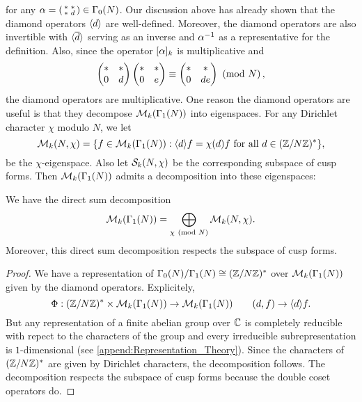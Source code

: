       for any $\alpha = \begin{psmallmatrix} \ast & \ast \\ \ast & d \end{psmallmatrix} \in \Gamma_{0}(N)$. Our discussion above has already shown that the diamond operators $\langle d\rangle$ are well-defined. Moreover, the diamond operators are also invertible with $\langle\overline{d}\rangle$ serving as an inverse and $\alpha^{-1}$ as a representative for the definition. Also, since the operator $[\alpha]_{k}$ is multiplicative and
      \[
        \begin{pmatrix} \ast & \ast \\ 0 & d \end{pmatrix}\begin{pmatrix} \ast & \ast \\ 0 & e \end{pmatrix} \equiv \begin{pmatrix} \ast & \ast \\ 0 & de \end{pmatrix} \ \left(\text{mod }N\right),
      \]
      the diamond operators are multiplicative. One reason the diamond operators are useful is that they decompose $\mathcal{M}_{k}(\Gamma_{1}(N))$ into eigenspaces. For any Dirichlet character $\chi$ modulo $N$, we let
      \[
        \mathcal{M}_{k}(N,\chi) = \{f \in \mathcal{M}_{k}(\Gamma_{1}(N)):\langle d\rangle f = \chi(d)f \text{ for all } d \in (\mathbb{Z}/N\mathbb{Z})^{\ast}\},
      \]
      be the $\chi$-eigenspace. Also let $\mathcal{S}_{k}(N,\chi)$ be the corresponding subspace of cusp forms. Then $\mathcal{M}_{k}(\Gamma_{1}(N))$ admits a decomposition into these eigenspaces:

      \begin{proposition}\label{thm:diamond_operator_decomposition_modular}
        We have the direct sum decomposition
        \[
          \mathcal{M}_{k}(\Gamma_{1}(N)) = \bigoplus_{\chi \ \left(\text{mod }N\right)}\mathcal{M}_{k}(N,\chi).
        \]
        Moreover, this direct sum decomposition respects the subspace of cusp forms.
      \end{proposition}
      \begin{proof}
        We have a representation of $\Gamma_{0}(N)/\Gamma_{1}(N) \cong (\mathbb{Z}/N\mathbb{Z})^{\ast}$ over $\mathcal{M}_{k}(\Gamma_{1}(N))$ given by the diamond operators. Explicitely,
        \[
          \Phi:(\mathbb{Z}/N\mathbb{Z})^{\ast} \times \mathcal{M}_{k}(\Gamma_{1}(N)) \to \mathcal{M}_{k}(\Gamma_{1}(N)) \qquad (d,f) \to \langle d\rangle f.
        \]
        But any representation of a finite abelian group over $\mathbb{C}$ is completely reducible with repect to the characters of the group and every irreducible subrepresentation is $1$-dimensional (see \cref{append:Representation_Theory}). Since the characters of $(\mathbb{Z}/N\mathbb{Z})^{\ast}$ are given by Dirichlet characters, the decomposition follows. The decomposition respects the subspace of cusp forms because the double coset operators do.
      \end{proof}
      
